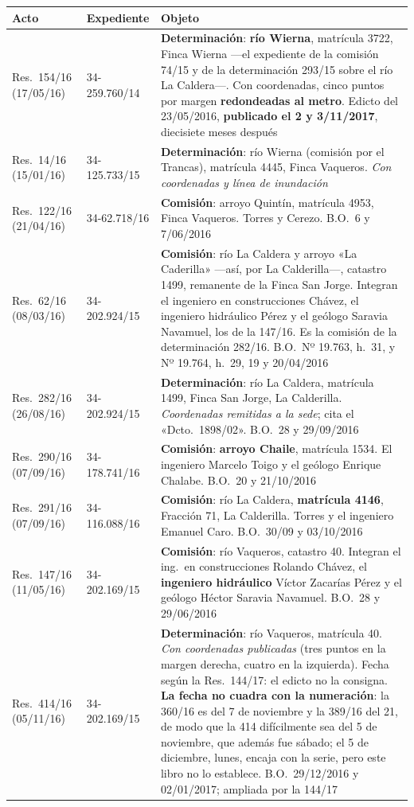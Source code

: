 {\small
\setlength{\LTpre}{0.6em}\setlength{\LTpost}{1.2em}
\begin{longtable}{@{}p{2.3cm}p{2.6cm}p{7cm}@{}}
\toprule
\textbf{Acto} & \textbf{Expediente} & \textbf{Objeto} \\
\midrule
\endhead
Res.\ 154/16 (17/05/16) & 34-259.760/14 & \textbf{Determinación}: \textbf{río Wierna}, matrícula 3722, Finca Wierna ---el expediente de la comisión 74/15 y de la determinación 293/15 sobre el río La Caldera---. Con coordenadas, cinco puntos por margen \textbf{redondeadas al metro}. Edicto del 23/05/2016, \textbf{publicado el 2 y 3/11/2017}, diecisiete meses después \\
Res.\ 14/16 (15/01/16) & 34-125.733/15 & \textbf{Determinación}: río Wierna (comisión por el Trancas), matrícula 4445, Finca Vaqueros. \textit{Con coordenadas y línea de inundación} \\
Res.\ 122/16 (21/04/16) & 34-62.718/16 & \textbf{Comisión}: arroyo Quintín, matrícula 4953, Finca Vaqueros. Torres y Cerezo. B.O.\ 6 y 7/06/2016 \\
Res.\ 62/16 (08/03/16) & 34-202.924/15 & \textbf{Comisión}: río La Caldera y arroyo «La Caderilla» ---así, por La Calderilla---, catastro 1499, remanente de la Finca San Jorge. Integran el ingeniero en construcciones Chávez, el ingeniero hidráulico Pérez y el geólogo Saravia Navamuel, los de la 147/16. Es la comisión de la determinación 282/16. B.O.\ Nº 19.763, h.\ 31, y Nº 19.764, h.\ 29, 19 y 20/04/2016 \\
Res.\ 282/16 (26/08/16) & 34-202.924/15 & \textbf{Determinación}: río La Caldera, matrícula 1499, Finca San Jorge, La Calderilla. \textit{Coordenadas remitidas a la sede}; cita el «Dcto.\ 1898/02». B.O.\ 28 y 29/09/2016 \\
Res.\ 290/16 (07/09/16) & 34-178.741/16 & \textbf{Comisión}: \textbf{arroyo Chaile}, matrícula 1534. El ingeniero Marcelo Toigo y el geólogo Enrique Chalabe. B.O.\ 20 y 21/10/2016 \\
Res.\ 291/16 (07/09/16) & 34-116.088/16 & \textbf{Comisión}: río La Caldera, \textbf{matrícula 4146}, Fracción 71, La Calderilla. Torres y el ingeniero Emanuel Caro. B.O.\ 30/09 y 03/10/2016 \\
Res.\ 147/16 (11/05/16) & 34-202.169/15 & \textbf{Comisión}: río Vaqueros, catastro 40. Integran el ing.\ en construcciones Rolando Chávez, el \textbf{ingeniero hidráulico} Víctor Zacarías Pérez y el geólogo Héctor Saravia Navamuel. B.O.\ 28 y 29/06/2016 \\
Res.\ 414/16 (05/11/16) & 34-202.169/15 & \textbf{Determinación}: río Vaqueros, matrícula 40. \textit{Con coordenadas publicadas} (tres puntos en la margen derecha, cuatro en la izquierda). Fecha según la Res.\ 144/17: el edicto no la consigna. \textbf{La fecha no cuadra con la numeración}: la 360/16 es del 7 de noviembre y la 389/16 del 21, de modo que la 414 difícilmente sea del 5 de noviembre, que además fue sábado; el 5 de diciembre, lunes, encaja con la serie, pero este libro no lo establece. B.O.\ 29/12/2016 y 02/01/2017; ampliada por la 144/17 \\

\end{longtable}}
